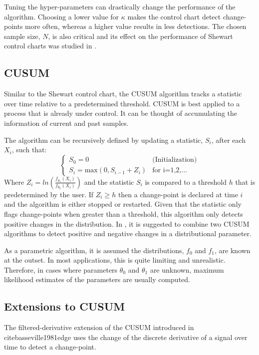 Tuning the hyper-parameters can drastically change the performance of the algorithm. Choosing a lower value for $\kappa$ makes the control chart detect change-points more often, whereas a higher value results in less detections. The chosen sample size, $N$, is also critical and its effect on the performance of Shewart control charts was studied in \cite{haridy2017effect}.

\subsection{CUSUM}
Similar to the Shewart control chart, the CUSUM algorithm tracks a statistic over time relative to a predetermined threshold. CUSUM is best applied to a process that is already under control. It can be thought of accumulating the information of current and past samples. 

The algorithm can be recursively defined by updating a statistic, $S_i$, after each $X_i$, such that:
\begin{equation}
  \begin{cases}
    S_0 = 0  & \text{(Initialization)} \\
    S_i = \text{max}(0, S_{i-1} + Z_i) & \text{for i=1,2,...}
  \end{cases}
\end{equation}
Where $Z_i=ln(\frac{f_{\theta_1}(X_i)}{f_{\theta_0}(X_i)})$ and the statistic $S_i$ is compared to a threshold $h$ that is predetermined by the user. If $Z_i \geq h$ then a change-point is declared at time $i$ and the algorithm is either stopped or restarted. Given that the statistic only flags change-points when greater than a threshold, this algorithm only detects positive changes in the distribution. In \cite{page1954continuous}, it is suggested to combine two CUSUM algorithms to detect positive and negative changes in a distributional parameter.

As a parametric algorithm, it is assumed the distributions, $f_0$ and $f_1$, are known at the outset. In most applications, this is quite limiting and unrealistic. Therefore, in cases where parameters $\theta_0$ and $\theta_1$ are unknown, maximum likelihood estimates of the parameters are usually computed.

\subsection{Extensions to CUSUM}
The filtered-derivative extension of the CUSUM introduced in \\cite{basseville1981edge} uses the change of the discrete derivative of a signal over time to detect a change-point. 

